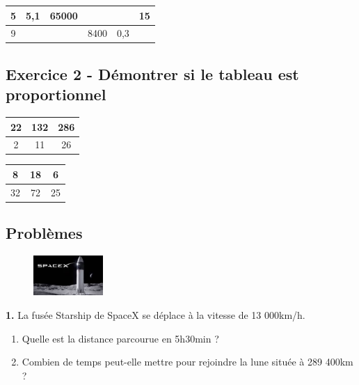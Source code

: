 \begin{center}
  \begin{tabular}{|c|c|c|c|c|c|}
    \hline
   5 &  5,1                   &                  65000 &  \phantom{100 000 000} &  \phantom{100 000 000} &                     15\\ \hline
   9 &  \phantom{100 000 000} &  \phantom{100 000 000} &                   8400 &                    0,3 &  \phantom{100 000 000}\\ \hline     
  \end{tabular}
\end{center}
\Pointilles[4]


\subsection*{Exercice 2 - Démontrer si le tableau est proportionnel}

\begin{multicols}{2}
  \begin{center}
    \begin{tabular}{|c|c|c|}
      \hline
      22 & 132 & 286 \\  \hline
      2 & 11 & 26\\  \hline
    \end{tabular}
  \end{center}
  \begin{center}
    \begin{tabular}{|c|c|c|}
      \hline
      8 & 18 & 6 \\  \hline
      32 & 72 & 25\\  \hline
    \end{tabular}
  \end{center}
\end{multicols}

\Pointilles[6]


\subsection*{Problèmes}

\begin{minipage}[t]{0.25\textwidth}
  \begin{figure}[H]
    \centering
    \includegraphics[width=100px]{4x2-proportionnalite/ex1.jpg}
  \end{figure}
\end{minipage}
\begin{minipage}[t]{0.75\textwidth}
\textbf{1.} La fusée Starship de SpaceX se déplace à la vitesse de 13 000km/h. 

\begin{enumerate}
  \item[1.] Quelle est la distance parcourue en 5h30min ? 
  \item[2.] Combien de temps peut-elle mettre pour rejoindre la lune située à 289 400km ? 
\end{enumerate}

\Pointilles[2]
\end{minipage}

